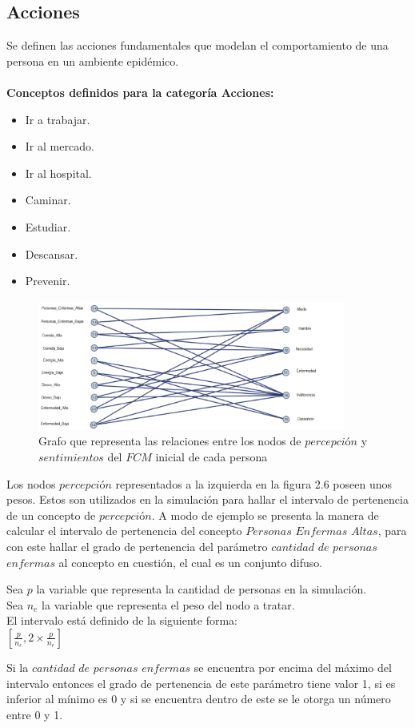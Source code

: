 \subsection{Acciones}
Se definen las acciones fundamentales que modelan el comportamiento de una persona en un ambiente epidémico.\\
\\
\textbf{Conceptos definidos para la categoría Acciones:}
\begin{itemize}
    \item Ir a trabajar.
    \item Ir al mercado.
    \item Ir al hospital.
    \item Caminar.
    \item Estudiar.
    \item Descansar.
    \item Prevenir.
\end{itemize}

\begin{figure}[htb]
    \centering
    \includegraphics[width=0.9\textwidth]{Graphics/Grafo_Pers-Sent.png}
    \caption{Grafo que representa las relaciones entre los nodos de $percepci$ó$n$ y $sentimientos$ del $FCM$ inicial de cada persona}
\end{figure}
\newpage
Los nodos $percepci$ó$n$ representados a la izquierda en la figura 2.6 poseen unos pesos. Estos son utilizados
en la simulación para hallar el intervalo de pertenencia de un concepto de $percepci$ó$n$. A modo de ejemplo se 
presenta la manera de calcular el intervalo de pertenencia del concepto $Personas$ $Enfermas$ $Altas$, para con 
este hallar el grado de pertenencia del parámetro $cantidad$ $de$ $personas$ $enfermas$ al concepto en cuestión, el 
cual es un conjunto difuso.
\begin{center}
    Sea $p$ la variable que representa la cantidad de personas en la simulación.\\
    Sea $n_e$ la variable que representa el peso del nodo a tratar.\\
    El intervalo está definido de la siguiente forma:\\
    $[\frac{p}{n_e},2 \times \frac{p}{n_e}]$
\end{center}
Si la $cantidad$ $de$ $personas$ $enfermas$ se encuentra por encima del máximo del intervalo entonces el grado
de pertenencia de este parámetro tiene valor 1, si es inferior al mínimo es 0 y si se encuentra dentro de 
este se le otorga un número	entre 0 y 1.\\

